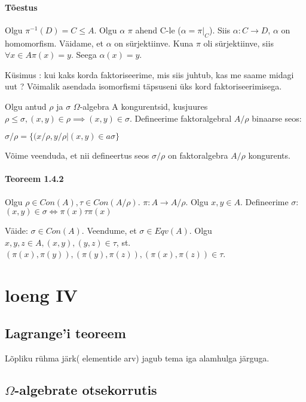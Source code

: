 \documentclass[12pt]{article}
\begin{document}
\paragraph*{Tõestus}

Olgu $\pi^{-1}(D) = C \leq A$. Olgu $\alpha$ $\pi$ ahend C-le ($\alpha = \pi|_{C}$). Siis $\alpha : C \rightarrow D$, $\alpha$ on homomorfism. Väidame, et $\alpha$ on s\"urjektiinve. Kuna $\pi$ oli s\"urjektiinve, siis $\forall x \in A \pi(x) = y$. Seega $\alpha(x) = y$. 

K\"usimus : kui kaks korda faktoriseerime, mis siis juhtub, kas me saame midagi uut ? Võimalik asendada isomorfismi täpsuseni üks kord faktoriseerimisega. 

Olgu antud $\rho$ ja $\sigma$ $\Omega$-algebra A kongurentsid, kusjuures $\rho \leq \sigma, (x,y) \in \rho \implies (x,y) \in \sigma$. Defineerime faktoralgebral $A/ \rho$ binaarse seos:

$\sigma / \rho = \{(x / \rho, y / \rho  | (x,y) \in a \sigma \}$

Võime veenduda, et nii defineertus seos $\sigma / \rho$ on faktoralgebra $A / \rho$ kongurents.

\paragraph{Teoreem 1.4.2}

Olgu $\rho \in Con(A), \tau \in Con(A / \rho)$. $\pi : A \rightarrow A / \rho$. Olgu $x,y \in A$.  Defineerime $\sigma$: $(x,y) \in \sigma \iff \pi(x) \tau \pi(x)$

Väide: $\sigma \in Con(A)$. Veendume, et $\sigma \in Eqv(A)$. Olgu $x,y,z \in A, (x,y), (y,z) \in \tau$, st. $(\pi(x),\pi(y)), (\pi(y),\pi(z)), (\pi(x),\pi(z)) \in \tau$.


\section{loeng IV}

\subsection{Lagrange'i teoreem}

Lõpliku rühma järk( elementide arv) jagub tema iga alamhulga järguga.

\subsection{$\Omega$-algebrate otsekorrutis}
\end{document}
